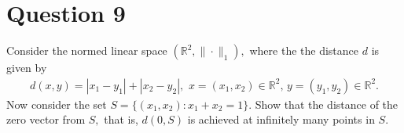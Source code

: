 \section{Question 9}
\horz

Consider the normed linear space $(\mathbb R ^{2}, \|\cdot\|_1 ),$ where the the distance $d$ is given by 
\begin{align*}
d(x,y) = |x_1-y_1| + |x_2-y_2|,\,\,x=(x_1,x_2)\in \mathbb R^2, \,y=(y_1,y_2)\in \mathbb R^2.
\end{align*}
 Now consider the set $S= \{ ( x_{1} , x_{2}) : x_{1} + x_{2} =1 \}$. Show that the distance of the zero vector from $S,$ that is, $d(0,S)$  is achieved at infinitely many points in $S$.
 
 \horz
